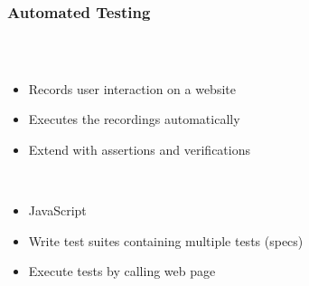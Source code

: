 \begin{frame}
  \frametitle{Automated Testing}
  \begin{columns}
    \begin{column}{0.8\textwidth}
      \begin{description}[]
        \item[Frontend] \hfill \\
        \begin{itemize}
          \item Records user interaction on a website
          \item Executes the recordings automatically
          \item Extend with assertions and verifications
        \end{itemize}

        \bigskip
        \item[Backend] \hfill \\
          \begin{itemize}
            \item JavaScript
            \item Write test suites containing multiple tests (specs)
            \item Execute tests by calling web page
        \end{itemize}
      \end{description}
    \end{column}


\end{columns}
\end{frame}
